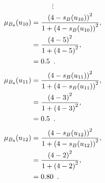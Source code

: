 \documentclass[a4paper,openany]{book}
\begin{document}
				\[
					\vdots
				\]
				\begin{align}
					\mu_{B_4}(u_{10}) &= \frac{\left(4-s_B(u_{10})\right)^2}{1 + \left(4-s_B(u_{10})\right)^2} ,\\
					&= \frac{\left(4-5\right)^2}{1 + \left(4-5\right)^2} \notag ,\\
					&= 0.5 \enspace. \notag
				\end{align}
				\begin{align}
					\mu_{B_4}(u_{11}) &= \frac{\left(4-s_B(u_{11})\right)^2}{1 + \left(4-s_B(u_{11})\right)^2} ,\\
					&= \frac{\left(4-3\right)^2}{1 + \left(4-3\right)^2} \notag ,\\
					&= 0.5 \enspace. \notag
				\end{align}
				\begin{align}
					\mu_{B_4}(u_{12}) &= \frac{\left(4-s_B(u_{12})\right)^2}{1 + \left(4-s_B(u_{12})\right)^2} ,\\
					&= \frac{\left(4-2\right)^2}{1 + \left(4-2\right)^2} \notag ,\\
					&= 0.80 \enspace. \notag
				\end{align}
\end{document}
